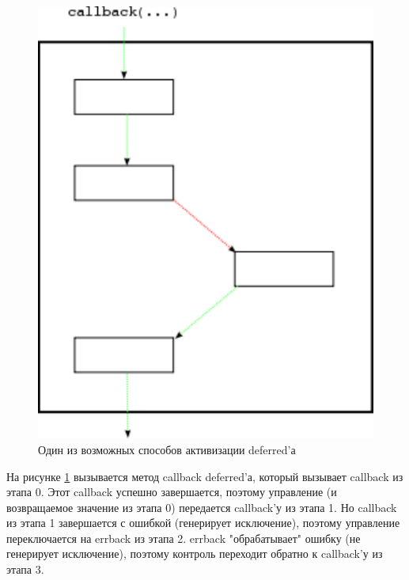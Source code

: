 \begin{figure}[h]
\begin{center}
    \includegraphics[height=0.3\textheight]{images/deferred-3.pdf}
    \caption{Один из возможных способов активизации deferred'а\label{fig:deferred-3}}
\end{center}
\end{figure}


На рисунке \ref{fig:deferred-3} вызывается метод callback deferred'а, 
который вызывает callback из этапа 0. Этот callback успешно завершается, 
поэтому управление (и возвращаемое значение из этапа 0) передается 
callback'у из этапа 1. Но callback из этапа 1 завершается с ошибкой (генерирует 
исключение), поэтому управление переключается на errback из этапа 2. errback 
"обрабатывает" ошибку (не генерирует исключение), поэтому контроль 
переходит обратно к callback'у из этапа 3.


